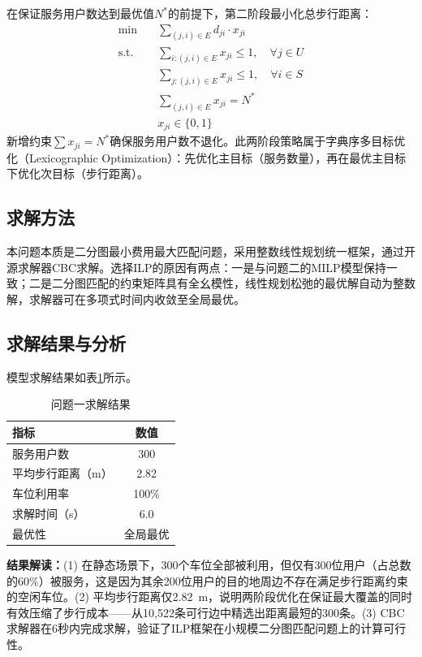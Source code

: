 \documentclass[12pt,a4paper]{ctexart}
\begin{document}
在保证服务用户数达到最优值$N^*$的前提下，第二阶段最小化总步行距离：
\begin{equation}\label{eq:q1s2}
  \begin{aligned}
    \min \quad & \sum_{(j,i) \in E} d_{ji} \cdot x_{ji} \\
    \text{s.t.} \quad & \sum_{i: (j,i) \in E} x_{ji} \leq 1, \quad \forall j \in U \\
    & \sum_{j: (j,i) \in E} x_{ji} \leq 1, \quad \forall i \in S \\
    & \sum_{(j,i) \in E} x_{ji} = N^* \\
    & x_{ji} \in \{0, 1\}
  \end{aligned}
\end{equation}
新增约束$\sum x_{ji} = N^*$确保服务用户数不退化。此两阶段策略属于字典序多目标优化（Lexicographic Optimization）：先优化主目标（服务数量），再在最优主目标下优化次目标（步行距离）。

\subsection{求解方法}

本问题本质是二分图最小费用最大匹配问题，采用整数线性规划统一框架，通过开源求解器CBC求解。选择ILP的原因有两点：一是与问题二的MILP模型保持一致；二是二分图匹配的约束矩阵具有全幺模性，线性规划松弛的最优解自动为整数解，求解器可在多项式时间内收敛至全局最优。

\subsection{求解结果与分析}

模型求解结果如表\ref{tab:q1result}所示。

\begin{table}[H]
  \centering
  \caption{问题一求解结果}
  \label{tab:q1result}
  \begin{tabular}{lc}
    \toprule
    指标 & 数值 \\
    \midrule
    服务用户数 & 300 \\
    平均步行距离（m） & 2.82 \\
    车位利用率 & 100\% \\
    求解时间（s） & 6.0 \\
    最优性 & 全局最优 \\
    \bottomrule
  \end{tabular}
\end{table}

\textbf{结果解读：}(1) 在静态场景下，300个车位全部被利用，但仅有300位用户（占总数的60\%）被服务，这是因为其余200位用户的目的地周边不存在满足步行距离约束的空闲车位。(2) 平均步行距离仅2.82~m，说明两阶段优化在保证最大覆盖的同时有效压缩了步行成本——从10,522条可行边中精选出距离最短的300条。(3) CBC求解器在6秒内完成求解，验证了ILP框架在小规模二分图匹配问题上的计算可行性。
\end{document}
